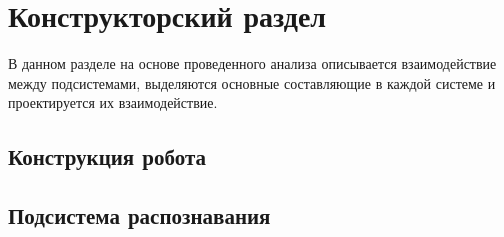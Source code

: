 \chapter{Конструкторский раздел}
\label{cha:design}

В данном разделе на основе проведенного анализа описывается взаимодействие между подсистемами, выделяются основные составляющие в каждой системе и проектируется их взаимодействие.

\section{Конструкция робота}


\section{Подсистема распознавания}

